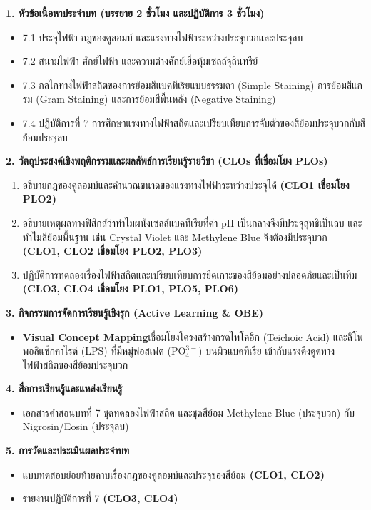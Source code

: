 \cleardoublepage
{}
\begin{planbox}
\noindent\textbf{1. หัวข้อเนื้อหาประจำบท (บรรยาย 2 ชั่วโมง และปฏิบัติการ 3 ชั่วโมง)}
\begin{itemize}
    \item 7.1 ประจุไฟฟ้า กฎของคูลอมบ์ และแรงทางไฟฟ้าระหว่างประจุบวกและประจุลบ
    \item 7.2 สนามไฟฟ้า ศักย์ไฟฟ้า และความต่างศักย์เยื่อหุ้มเซลล์จุลินทรีย์
    \item 7.3 กลไกทางไฟฟ้าสถิตของการย้อมสีแบคทีเรียแบบธรรมดา (Simple Staining) การย้อมสีแกรม (Gram Staining) และการย้อมสีพื้นหลัง (Negative Staining)
    \item 7.4 ปฏิบัติการที่ 7 การศึกษาแรงทางไฟฟ้าสถิตและเปรียบเทียบการจับตัวของสีย้อมประจุบวกกับสีย้อมประจุลบ
\end{itemize}

\noindent\textbf{2. วัตถุประสงค์เชิงพฤติกรรมและผลลัพธ์การเรียนรู้รายวิชา (CLOs ที่เชื่อมโยง PLOs)}
\begin{enumerate}
    \item อธิบายกฎของคูลอมบ์และคำนวณขนาดของแรงทางไฟฟ้าระหว่างประจุได้ \textbf{(CLO1 เชื่อมโยง PLO2)}
    \item อธิบายเหตุผลทางฟิสิกส์ว่าทำไมผนังเซลล์แบคทีเรียที่ค่า pH เป็นกลางจึงมีประจุสุทธิเป็นลบ และทำไมสีย้อมพื้นฐาน เช่น Crystal Violet และ Methylene Blue จึงต้องมีประจุบวก \textbf{(CLO1, CLO2 เชื่อมโยง PLO2, PLO3)}
    \item ปฏิบัติการทดลองเรื่องไฟฟ้าสถิตและเปรียบเทียบการยึดเกาะของสีย้อมอย่างปลอดภัยและเป็นทีม \textbf{(CLO3, CLO4 เชื่อมโยง PLO1, PLO5, PLO6)}
\end{enumerate}

\noindent\textbf{3. กิจกรรมการจัดการเรียนรู้เชิงรุก (Active Learning \& OBE)}
\begin{itemize}
    \item \textbf{Visual Concept Mapping}\quad เชื่อมโยงโครงสร้างกรดไทโคอิก (Teichoic Acid) และลิโพพอลิแซ็กคาไรด์ (LPS) ที่มีหมู่ฟอสเฟต ($\text{PO}_4^{3-}$) บนผิวแบคทีเรีย เข้ากับแรงดึงดูดทางไฟฟ้าสถิตของสีย้อมประจุบวก
\end{itemize}

\noindent\textbf{4. สื่อการเรียนรู้และแหล่งเรียนรู้}
\begin{itemize}
    \item เอกสารคำสอนบทที่ 7 ชุดทดลองไฟฟ้าสถิต และชุดสีย้อม Methylene Blue (ประจุบวก) กับ Nigrosin/Eosin (ประจุลบ)
\end{itemize}

\noindent\textbf{5. การวัดและประเมินผลประจำบท}
\begin{itemize}
    \item แบบทดสอบย่อยท้ายคาบเรื่องกฎของคูลอมบ์และประจุของสีย้อม \textbf{(CLO1, CLO2)}
    \item รายงานปฏิบัติการที่ 7 \textbf{(CLO3, CLO4)}
\end{itemize}
\end{planbox}
\clearpage

